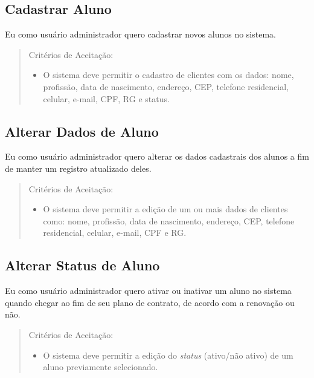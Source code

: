 \subsection[Cadastrar Aluno]{Cadastrar Aluno}
Eu como usuário administrador quero cadastrar novos alunos no sistema.

\begin{quote}
Critérios de Aceitação:
    \begin{itemize}
        \item O sistema deve permitir o cadastro de clientes com os dados: nome, profissão, data de nascimento, endereço, CEP, telefone residencial, celular, e-mail, CPF, RG e status.
    \end{itemize}
\end{quote}

\subsection[Alterar Dados de Aluno]{Alterar Dados de Aluno}
Eu como usuário administrador quero alterar os dados cadastrais dos alunos a fim
de manter um registro atualizado deles.

\begin{quote}
Critérios de Aceitação:
    \begin{itemize}
        \item O sistema deve permitir a edição de um ou mais dados de clientes como: nome,
        profissão, data de nascimento, endereço, CEP, telefone residencial, celular,
        e-mail, CPF e RG.
    \end{itemize}
\end{quote}

\subsection[Alterar Status de Aluno]{Alterar Status de Aluno}
Eu como usuário administrador quero ativar ou inativar um aluno no sistema
quando chegar ao fim de seu plano de contrato, de acordo com a renovação ou não.

\begin{quote}
Critérios de Aceitação:
    \begin{itemize}
        \item O sistema deve permitir a edição do \textsl{status} (ativo/não ativo) de um aluno
        previamente selecionado.
    \end{itemize}
\end{quote}

